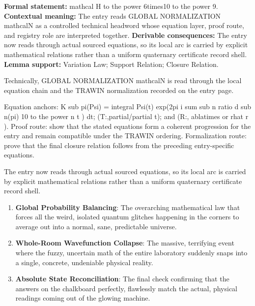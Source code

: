 \begingroup\footnotesize\setlength{\emergencystretch}{3em}\sloppy
\textbf{Formal statement:} mathcal H to the power 6times10 to the power 9. \textbf{Contextual meaning:} The entry reads GLOBAL NORMALIZATION mathcalN as a controlled technical headword whose equation layer, proof route, and registry role are interpreted together. \textbf{Derivable consequences:} The entry now reads through actual sourced equations, so its local arc is carried by explicit mathematical relations rather than a uniform quaternary certificate record shell. \textbf{Lemma support:} Variation Law; Support Relation; Closure Relation.\par
\endgroup

Technically, GLOBAL NORMALIZATION mathcalN is read through the local equation chain and the TRAWIN normalization recorded on the entry page.

Equation anchors: K sub pi(Psi) = integral Psi(t) exp(2pi i sum sub n ratio d sub n(pi) 10 to the power n t ) dt; (T:,partial/partial t); and (R:, ablatimes or rhat r ). Proof route: show that the stated equations form a coherent progression for the entry and remain compatible under the TRAWIN ordering. Formalization route: prove that the final closure relation follows from the preceding entry-specific equations.

The entry now reads through actual sourced equations, so its local arc is carried by explicit mathematical relations rather than a uniform quaternary certificate record shell.
\endgroup

\begin{enumerate}[leftmargin=1.6em,itemsep=6pt,topsep=4pt]
\item \textbf{Global Probability Balancing}: The overarching mathematical law that forces all the weird, isolated quantum glitches happening in the corners to average out into a normal, sane, predictable universe.
\item \textbf{Whole-Room Wavefunction Collapse}: The massive, terrifying event where the fuzzy, uncertain math of the entire laboratory suddenly snaps into a single, concrete, undeniable physical reality.
\item \textbf{Absolute State Reconciliation}: The final check confirming that the answers on the chalkboard perfectly, flawlessly match the actual, physical readings coming out of the glowing machine.
\end{enumerate}

